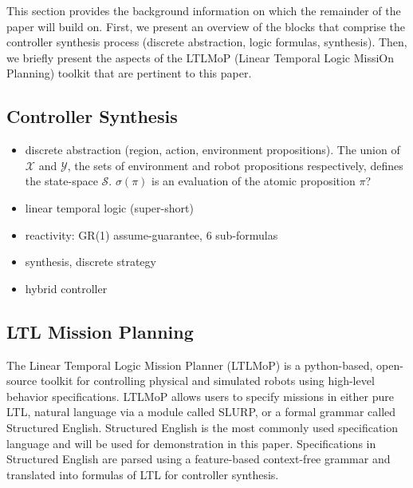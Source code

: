 This section provides the background information on which the remainder of the paper will build on. First, we present an overview of the blocks that comprise the controller synthesis process (discrete abstraction, logic formulas, synthesis). Then, we briefly present the aspects of the LTLMoP (Linear Temporal Logic MissiOn Planning) toolkit that are pertinent to this paper.

\subsection{Controller Synthesis}

\begin{itemize}
	\item discrete abstraction (region, action, environment propositions). The union of $\mathcal{X}$ and $\mathcal{Y}$, the sets of environment and robot propositions respectively, defines the state-space $\mathcal{S}$. $\sigma(\pi)$ is an evaluation of the atomic proposition $\pi$?
	\item linear temporal logic (super-short)
	\item reactivity: GR(1) assume-guarantee, 6 sub-formulas
	\item synthesis, discrete strategy
	\item hybrid controller
\end{itemize}

\subsection{LTL Mission Planning}

The Linear Temporal Logic Mission Planner (LTLMoP) \cite{Finucane2010} is a python-based, open-source toolkit for controlling physical and simulated robots using high-level behavior specifications. LTLMoP allows users to specify missions in either pure LTL, natural language via a module called SLURP, or a formal grammar called Structured English. Structured English is the most commonly used specification language and will be used for demonstration in this paper. Specifications in Structured English are parsed using a feature-based context-free grammar and translated into formulas of LTL for controller synthesis. 